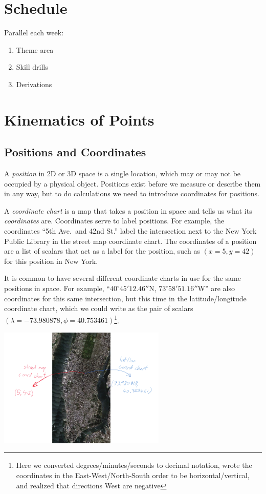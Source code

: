 \documentclass{article}
\begin{document}
\section{Schedule}

Parallel each week:
\begin{enumerate}
\item Theme area
\item Skill drills
\item Derivations
\end{enumerate}


\section{Kinematics of Points}

\subsection{Positions and Coordinates}

A \emph{position} in 2D or 3D space is a single location, which may or
may not be occupied by a physical object. Positions exist before we
measure or describe them in any way, but to do calculations we need to
introduce coordinates for positions.

A \emph{coordinate chart} is a map that takes a position in space and
tells us what its \emph{coordinates} are. Coordinates serve to label
positions. For example, the coordinates ``5th Ave.\ and 42nd St.''
label the intersection next to the New York Public Library in the
street map coordinate chart. The coordinates of a position are a list
of scalars that act as a label for the position, such as $(x = 5, y =
42)$ for this position in New York.

It is common to have several different coordinate charts in use for
the same positions in space. For example, ``$40^\circ 45' 12.46''$N,
$73^\circ 58' 51.16''$W'' are also coordinates for this same
intersection, but this time in the latitude/longitude coordinate
chart, which we could write as the pair of scalars $(\lambda =
-73.980878, \phi = 40.753461)$\footnote{Here we converted
  degrees/minutes/seconds to decimal notation, wrote the coordinates
  in the East-West/North-South order to be horizontal/vertical, and
  realized that directions West are negative}.

\begin{center}
  \includegraphics[width=8cm]{new_york_coords}
\end{center}
\end{document}
